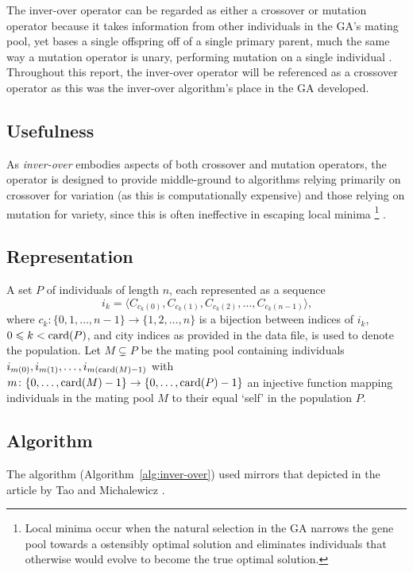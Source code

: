 The inver-over operator can be regarded as either a crossover or mutation 
operator because it takes information from other individuals in the GA's
mating pool, yet bases a single offspring off of a single primary parent, much 
the same way a mutation operator is unary, performing mutation on a single
individual \cite{p44}. Throughout this report, the inver-over operator will 
be referenced as a crossover operator as this was the inver-over 
algorithm's place in the GA developed.

\subsection{Usefulness}
As {\em inver-over} embodies aspects of both crossover and mutation 
operators, the operator  is designed to provide middle-ground to 
algorithms relying primarily on crossover for variation (as this is 
computationally expensive) and those relying on mutation for variety,
since this is often ineffective in escaping local minima%
\footnote{Local minima occur when the natural selection in the GA 
	narrows the gene pool towards a ostensibly optimal solution and 
	eliminates individuals that otherwise would evolve to become the 
	true optimal solution.} \cite{p44}.


\subsection{Representation}
A set $P$ of individuals of length $n$, each represented as a sequence
\begin{equation*}
i_k = \langle C_{c_k(0)}, C_{c_k(1)}, C_{c_k(2)}, \ldots, C_{c_k(n-1)} \rangle\text{,}
\end{equation*}
where $c_k\colon \{0, 1, \ldots, n-1\} \to \{ 1, 2, \ldots, n \}$ is a bijection 
between indices of $i_k$, $0 \leqslant k < \operatorname{card}(P)$, and city indices as 
provided in the data file, is used to denote the population. Let 
$M \subsetneq P$ be the mating pool containing individuals 
$i_{m(0)}, i_{m(1)},\ldots, i_{m(\operatorname{card}(M)-1)}$ with $m\colon 
\{0, \ldots, \operatorname{card}(M)-1\} \to \{0, \ldots, \operatorname{card}(P) -1\}$
 an injective function mapping individuals in the mating pool $M$ to 
their equal `self' in the population $P$.

\subsection{Algorithm}
The algorithm (Algorithm~\ref{alg:inver-over}) used mirrors that 
depicted in the article by Tao and Michalewicz \cite{p44}.

